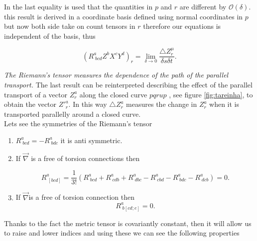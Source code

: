             In the last equality is used that the quantities in $p$ and $r$ are different by $\mathcal{O}(\delta)$. this result is derived in a coordinate basis defined using normal coordinates in $p$ but now both side take on count tensors in $r$ therefore our equations is independent of the basis, thus

            \begin{equation}
                \left(R^a_{\;bcd}Z^bX^cY^d \right)_r = \lim_{\delta \to 0} \frac{\triangle Z^{\mu}_r}{\delta s \delta t}.
            \end{equation}

            \textit{The Riemann's tensor measures the dependence of the path of the parallel transport.} The last result can be reinterpreted describing the effect of the parallel transport of a vector $Z^a_r$ along the closed curve $pqrup$ , see figure \ref{fig:tareinha}, to obtain the vector $Z'^a_r$. In this way $\triangle Z^a_r$ measures the change in $Z^a_r$ when it is transported parallelly around a closed curve.\\
            
            Lets see the symmetries of the Riemann's tensor

            \begin{enumerate}
                \item $R^a_{\;bcd} = - R^a_{\;bdc}$ it is anti symmetric.

                \item If $\vec{\nabla}$ is a free of torsion connections then

                \begin{equation}
                    R^a_{\;[bcd]} = \frac{1}{3!}\left(R^a_{\;bcd} + R^a_{\;cdb} + R^a_{\;dbc}- R^a_{\;cbd} - R^a_{\;bdc} - R^a_{\;dcb}\right) = 0.
                \end{equation}

                \item  If $\Vec{\nabla}$is a free of torsion connection then
                \begin{equation}
                    R^a_{\;b[cd;e]}=0.
                \end{equation}
            \end{enumerate}

            Thanks to the fact the metric tensor is covariantly constant, then it will allow us to raise and lower indices and using these we can see the following properties

